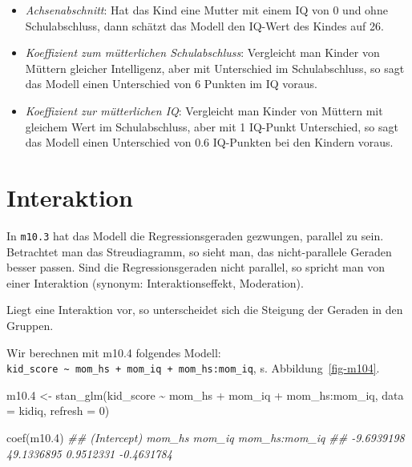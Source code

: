 \documentclass[
  a4paper,
  DIV=11]{scrreprt}
\newenvironment{Shaded}{\begin{snugshade}}{\end{snugshade}}
\newcommand{\AttributeTok}[1]{\textcolor[rgb]{0.40,0.45,0.13}{#1}}
\newcommand{\DecValTok}[1]{\textcolor[rgb]{0.68,0.00,0.00}{#1}}
\newcommand{\DocumentationTok}[1]{\textcolor[rgb]{0.37,0.37,0.37}{\textit{#1}}}
\newcommand{\FloatTok}[1]{\textcolor[rgb]{0.68,0.00,0.00}{#1}}
\newcommand{\FunctionTok}[1]{\textcolor[rgb]{0.28,0.35,0.67}{#1}}
\newcommand{\NormalTok}[1]{\textcolor[rgb]{0.00,0.23,0.31}{#1}}
\newcommand{\OtherTok}[1]{\textcolor[rgb]{0.00,0.23,0.31}{#1}}
\newcommand{\SpecialCharTok}[1]{\textcolor[rgb]{0.37,0.37,0.37}{#1}}
\providecommand{\tightlist}{%
  \setlength{\itemsep}{0pt}\setlength{\parskip}{0pt}}\usepackage{longtable,booktabs,array}
\theoremstyle{definition}
\theoremstyle{remark}
\begin{document}
\begin{itemize}
\tightlist
\item
  \emph{Achsenabschnitt}: Hat das Kind eine Mutter mit einem IQ von 0
  und ohne Schulabschluss, dann schätzt das Modell den IQ-Wert des
  Kindes auf 26.
\item
  \emph{Koeffizient zum mütterlichen Schulabschluss}: Vergleicht man
  Kinder von Müttern gleicher Intelligenz, aber mit Unterschied im
  Schulabschluss, so sagt das Modell einen Unterschied von 6 Punkten im
  IQ voraus.
\item
  \emph{Koeffizient zur mütterlichen IQ}: Vergleicht man Kinder von
  Müttern mit gleichem Wert im Schulabschluss, aber mit 1 IQ-Punkt
  Unterschied, so sagt das Modell einen Unterschied von 0.6 IQ-Punkten
  bei den Kindern voraus.
\end{itemize}

\hypertarget{interaktion}{%
\section{Interaktion}\label{interaktion}}

In \texttt{m10.3} hat das Modell die Regressionsgeraden gezwungen,
parallel zu sein. Betrachtet man das Streudiagramm, so sieht man, das
nicht-parallele Geraden besser passen. Sind die Regressionsgeraden nicht
parallel, so spricht man von einer Interaktion (synonym:
Interaktionseffekt, Moderation).

\begin{tcolorbox}[enhanced jigsaw, colframe=quarto-callout-important-color-frame, title=\textcolor{quarto-callout-important-color}{\faExclamation}\hspace{0.5em}{Wichtig}, breakable, leftrule=.75mm, coltitle=black, toptitle=1mm, bottomrule=.15mm, bottomtitle=1mm, opacityback=0, arc=.35mm, rightrule=.15mm, left=2mm, colbacktitle=quarto-callout-important-color!10!white, opacitybacktitle=0.6, toprule=.15mm, titlerule=0mm, colback=white]
Liegt eine Interaktion vor, so unterscheidet sich die Steigung der
Geraden in den Gruppen.
\end{tcolorbox}

Wir berechnen mit m10.4 folgendes Modell:
\texttt{kid\_score\ \textasciitilde{}\ mom\_hs\ +\ mom\_iq\ +\ mom\_hs:mom\_iq},
s. Abbildung~\ref{fig-m104}.

\begin{Shaded}
\begin{Highlighting}[]
\NormalTok{m10}\FloatTok{.4} \OtherTok{\textless{}{-}} 
  \FunctionTok{stan\_glm}\NormalTok{(kid\_score }\SpecialCharTok{\textasciitilde{}}\NormalTok{ mom\_hs }\SpecialCharTok{+}\NormalTok{ mom\_iq }\SpecialCharTok{+}\NormalTok{ mom\_hs}\SpecialCharTok{:}\NormalTok{mom\_iq, }
                  \AttributeTok{data =}\NormalTok{ kidiq, }\AttributeTok{refresh =} \DecValTok{0}\NormalTok{)}

\FunctionTok{coef}\NormalTok{(m10}\FloatTok{.4}\NormalTok{)}
\DocumentationTok{\#\#   (Intercept)        mom\_hs        mom\_iq mom\_hs:mom\_iq }
\DocumentationTok{\#\#    {-}9.6939198    49.1336895     0.9512331    {-}0.4631784}
\end{Highlighting}
\end{Shaded}
\end{document}
